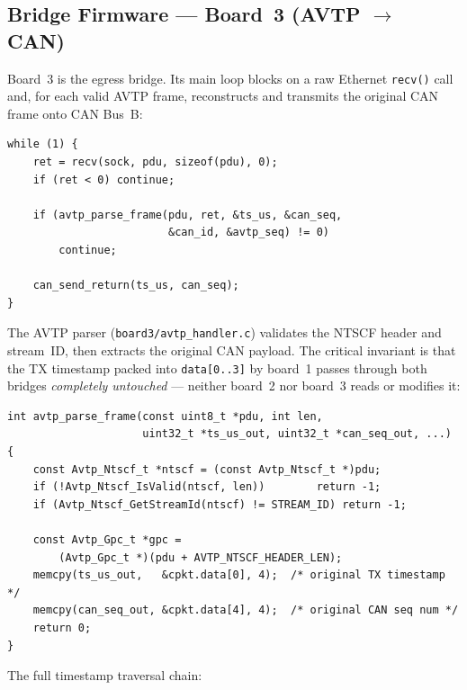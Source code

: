 \documentclass[11pt,a4paper]{article}
\begin{document}
\subsection{Bridge Firmware --- Board~3 (AVTP \texorpdfstring{$\rightarrow$}{->} CAN)}
\label{sec:board3fw}

Board~3 is the egress bridge.  Its main loop blocks on a raw Ethernet \texttt{recv()}
call and, for each valid AVTP frame, reconstructs and transmits the original CAN frame
onto CAN Bus~B:

\begin{lstlisting}[style=cstyle, caption={board3/main.c --- AVTP-to-CAN listener loop}]
while (1) {
    ret = recv(sock, pdu, sizeof(pdu), 0);
    if (ret < 0) continue;

    if (avtp_parse_frame(pdu, ret, &ts_us, &can_seq,
                         &can_id, &avtp_seq) != 0)
        continue;

    can_send_return(ts_us, can_seq);
}
\end{lstlisting}

The AVTP parser (\texttt{board3/avtp\_handler.c}) validates the NTSCF header and
stream~ID, then extracts the original CAN payload.  The critical invariant is that
the TX timestamp packed into \texttt{data[0..3]} by board~1 passes through both bridges
\emph{completely untouched} --- neither board~2 nor board~3 reads or modifies it:

\begin{lstlisting}[style=cstyle, caption={board3/avtp\_handler.c --- CAN payload extraction}]
int avtp_parse_frame(const uint8_t *pdu, int len,
                     uint32_t *ts_us_out, uint32_t *can_seq_out, ...) {
    const Avtp_Ntscf_t *ntscf = (const Avtp_Ntscf_t *)pdu;
    if (!Avtp_Ntscf_IsValid(ntscf, len))        return -1;
    if (Avtp_Ntscf_GetStreamId(ntscf) != STREAM_ID) return -1;

    const Avtp_Gpc_t *gpc =
        (Avtp_Gpc_t *)(pdu + AVTP_NTSCF_HEADER_LEN);
    memcpy(ts_us_out,   &cpkt.data[0], 4);  /* original TX timestamp */
    memcpy(can_seq_out, &cpkt.data[4], 4);  /* original CAN seq num */
    return 0;
}
\end{lstlisting}

The full timestamp traversal chain:
\end{document}

